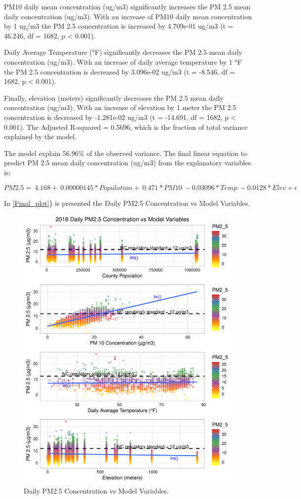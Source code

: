 \documentclass[12pt,]{article}
\begin{document}
PM10 daily mean concentration (ug/m3) significantly increases the PM 2.5
mean daily concentration (ug/m3). With an increase of PM10 daily mean
concentration by 1 ug/m3 the PM 2.5 concentration is increased by
4.709e-01 ug/m3 (t = 46.246, df = 1682, p \textless{} 0.001).

Daily Average Temperature (°F) significantly decreases the PM 2.5 mean
daily concentration (ug/m3). With an increase of daily average
temperature by 1 °F the PM 2.5 concentration is decreased by 3.096e-02
ug/m3 (t = -8.546, df = 1682, p \textless{} 0.001).

Finally, elevation (meters) significantly decreases the PM 2.5 mean
daily concentration (ug/m3). With an increase of elevation by 1 meter
the PM 2.5 concentration is decreased by -1.281e-02 ug/m3 (t = -14.691,
df = 1682, p \textless{} 0.001). The Adjusted R-squared = 0.5696, which
is the fraction of total variance explained by the model.

The model explain 56.96\% of the observed variance. The final linear
equation to predict PM 2.5 mean daily concentration (ug/m3) from the
explanatory variables is:

\[ PM2.5 = \ 4.168 + \ 0.00000145*Population + \ 0.471*PM10  \ -0.03096*Temp \ -0.0128*Elev + \epsilon \]

In \autoref{Final_plot}\} is presented the Daily PM2.5 Concentration vs
Model Variables.

\begin{figure}
\centering
\includegraphics{Raby_ENV872_Project_files/figure-latex/unnamed-chunk-60-1.pdf}
\caption{Daily PM2.5 Concentration vs Model Variables.
\label{Final_plot}}
\end{figure}
\end{document}

